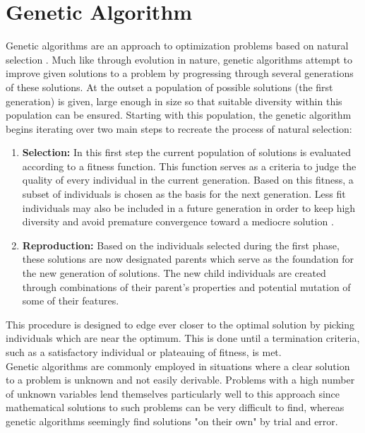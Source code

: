\section{Genetic Algorithm}
Genetic algorithms are an approach to optimization problems based on natural selection \cite{Holland1992}. Much like through evolution in nature, genetic algorithms attempt to improve given solutions to a problem by progressing through several generations of these solutions. At the outset a population of possible solutions (the first generation) is given, large enough in size so that suitable diversity within this population can be ensured. Starting with this population, the genetic algorithm begins iterating over two main steps to recreate the process of natural selection:
\begin{enumerate}
\item \textbf{Selection:} In this first step the current population of solutions is evaluated according to a fitness function. This function serves as a criteria to judge the quality of every individual in the current generation. Based on this fitness, a subset of individuals is chosen as the basis for the next generation. Less fit individuals may also be included in a future generation in order to keep high diversity and avoid premature convergence toward a mediocre solution \cite{Kumar2010}.
\item \textbf{Reproduction:} Based on the individuals selected during the first phase, these solutions are now designated parents which serve as the foundation for the new generation of solutions. The new child individuals are created through combinations of their parent's properties and potential mutation of some of their features.
\end{enumerate}
This procedure is designed to edge ever closer to the optimal solution by picking individuals which are near the optimum. This is done until a termination criteria, such as a satisfactory individual or plateauing of fitness, is met.\\
\hspace*{0.5ex}\hspace{0.5ex} Genetic algorithms are commonly employed in situations where a clear solution to a problem is unknown and not easily derivable. Problems with a high number of unknown variables lend themselves particularly well to this approach since  mathematical solutions to such problems can be very difficult to find, whereas genetic algorithms seemingly find solutions "on their own" by trial and error.
